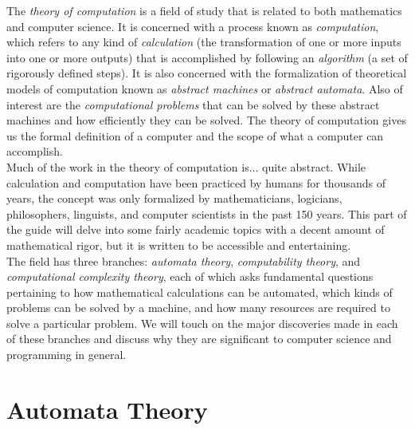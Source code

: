 The \textit{theory of computation} is a field of study that is related to both mathematics and computer science. It is concerned with a process known as \textit{computation}, which refers to any kind of \textit{calculation} (the transformation of one or more inputs into one or more outputs) that is accomplished by following an \textit{algorithm} (a set of rigorously defined steps). It is also concerned with the formalization of theoretical models of computation known as \textit{abstract machines} or \textit{abstract automata}. Also of interest are the \textit{computational problems} that can be solved by these abstract machines and how efficiently they can be solved. The theory of computation gives us the formal definition of a computer and the scope of what a computer can accomplish. \\

Much of the work in the theory of computation is$\dots$ quite abstract. While calculation and computation have been practiced by humans for thousands of years, the concept was only formalized by mathematicians, logicians, philosophers, linguists, and computer scientists in the past 150 years. This part of the guide will delve into some fairly academic topics with a decent amount of mathematical rigor, but it is written to be accessible and entertaining. \\

The field has three branches: \textit{automata theory}, \textit{computability theory}, and \textit{computational complexity theory}, each of which asks fundamental questions pertaining to how mathematical calculations can be automated, which kinds of problems can be solved by a machine, and how many resources are required to solve a particular problem. We will touch on the major discoveries made in each of these branches and discuss why they are significant to computer science and programming in general. \\



\toclineskip
\section{Automata Theory}


